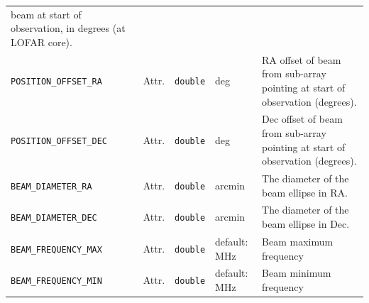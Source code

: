 \documentclass[a4paper,10pt,bibtotoc]{scrartcl}
\begin{document}
\begin{supertabular}{|p{3.5cm}p{1cm}p{2.5cm}p{3.5cm}p{5cm}|}
  beam at start of observation, in degrees (at LOFAR core). \\
  \small{\verb|POSITION_OFFSET_RA|} & Attr. & \verb|double| & deg & RA offset of beam from sub-array pointing at start of observation (degrees). \\
  \small{\verb|POSITION_OFFSET_DEC|} & Attr. & \verb|double| & deg & Dec offset
  of beam from sub-array pointing at start of observation (degrees). \\
  \small{\verb|BEAM_DIAMETER_RA|} & Attr. & \verb|double| & arcmin & The diameter of the beam ellipse
  in RA. \\
  \small{\verb|BEAM_DIAMETER_DEC|} & Attr. & \verb|double| & arcmin & The diameter of the beam ellipse 
  in Dec. \\
   \small{\verb|BEAM_FREQUENCY_MAX|} & Attr. & \verb|double| & default: MHz & Beam maximum frequency \\
   \small{\verb|BEAM_FREQUENCY_MIN|} & Attr. & \verb|double| & default: MHz & Beam minimum frequency \\


\end{supertabular}
\end{document}
